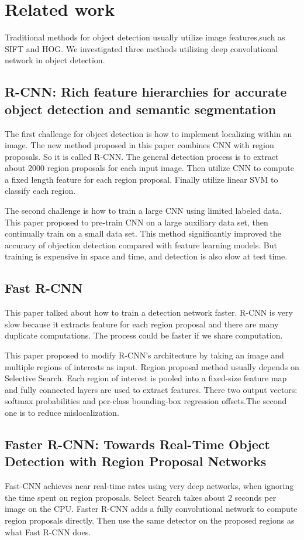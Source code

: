 
\section{Related work}
\label{others}
Traditional methods for object detection usually utilize image features,such as SIFT and HOG. We investigated three methods utilizing deep convolutional network in object detection.
\subsection{R-CNN: Rich feature hierarchies for accurate object detection and semantic segmentation}

 The first challenge for object detection is how to implement localizing within an image. The new method proposed in this paper\cite {rcnn} combines CNN with region proposals. So it is called R-CNN. The general detection process is to extract about 2000 region proposals for each input image. Then utilize CNN to compute a fixed length feature for each region proposal. Finally utilize linear SVM to classify each region. 


The second challenge is how to train a large CNN using limited labeled data. This paper proposed to pre-train CNN on a large auxiliary data set, then continually train on a small data set. This method significantly improved the accuracy of objection detection compared with feature learning models. But training is expensive in space and time, and detection is also slow at test time.

\subsection{Fast R-CNN}
This paper\cite {fast-rcnn} talked about how to train a detection network faster. R-CNN is very slow because it extracts feature for each region proposal and there are many duplicate computations. The process could be faster if we share computation. 

This paper proposed to modify R-CNN’s architecture by taking an image and multiple regions of interests as input. Region proposal method usually depends on Selective Search. Each region of interest is pooled into a fixed-size feature map and fully connected layers are used to extract features. There two output vectors: softmax probabilities and per-class bounding-box regression offsets.The second one is to reduce mislocalization.

\subsection{Faster R-CNN: Towards Real-Time Object Detection with Region Proposal Networks}
Fast-CNN achieves near real-time rates using very deep networks, when ignoring the time spent on region proposals. Select Search takes about 2 seconds per image on the CPU. Faster R-CNN\cite {faster-rcnn} adds a fully convolutional network to compute region proposals directly. Then use the same detector on the proposed regions as what Fast R-CNN does. 


